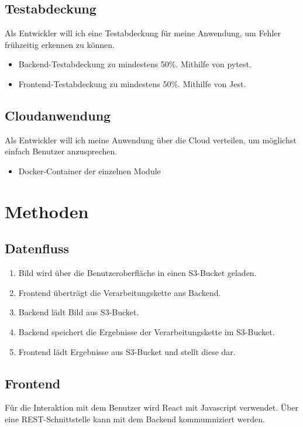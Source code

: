 \documentclass[conference]{IEEEtran}
\begin{document}
\subsection{Testabdeckung}
Als Entwickler will ich eine Testabdeckung für meine Anwendung, um Fehler frühzeitig erkennen zu können.
\begin{itemize}
	\item Backend-Testabdeckung zu mindestens 50\%. Mithilfe von pytest.
	\item Frontend-Testabdeckung zu mindestens 50\%. Mithilfe von Jest.
\end{itemize}

\subsection{Cloudanwendung}
Als Entwickler will ich meine Anwendung über die Cloud verteilen, um möglichst einfach Benutzer anzusprechen.
\begin{itemize}
	\item Docker-Container der einzelnen Module
\end{itemize}

\section{Methoden}

\subsection{Datenfluss}
\begin{enumerate}
	\item Bild wird über die Benutzeroberfläche in einen S3-Bucket geladen.
	\item Frontend überträgt die Verarbeitungskette ans Backend.
	\item Backend lädt Bild aus S3-Bucket.
	\item Backend speichert die Ergebnisse der Verarbeitungskette im S3-Bucket.
	\item Frontend lädt Ergebnisse aus S3-Bucket und stellt diese dar.
\end{enumerate}

\subsection{Frontend}
Für die Interaktion mit dem Benutzer wird React mit Javascript verwendet. Über eine REST-Schnittstelle kann mit dem Backend kommumniziert werden.
\end{document}
